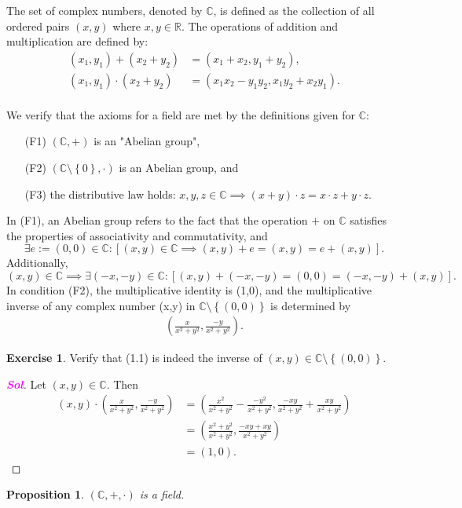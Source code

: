\documentclass[12pt,openany]{book}
\newtheorem{proposition}[theorem]{Proposition}
\theoremstyle{definition}
\newtheorem{exercise}{Exercise}[section]
\newcommand{\set}[1]{\left\{#1\right\}}
\newcommand{\R}{\mathbb{R}}
\newcommand{\C}{\mathbb{C}}
\newcommand{\of}[1]{\left( #1 \right)}
\newcommand{\sol}{\textcolor{magenta}{\bf Sol}}
\begin{document}
	The set of complex numbers, denoted by $\C$, is defined as the collection of all ordered pairs $(x,y)$ where $x,y\in\R$. The operations of addition and multiplication are defined by:\begin{align*}
		(x_1,y_1)+(x_2+y_2)&=(x_1+x_2,y_1+y_2),\\
		(x_1,y_1)\cdot(x_2+y_2)&=(x_1x_2-y_1y_2,x_1y_2+x_2y_1).\\
	\end{align*}
	
	We verify that the axioms for a field are met by the definitions given for $\C$: \begin{itemize}
		\item[(F1)] $\of{\C,+}$ is an "Abelian group",
		\item[(F2)] $\of{\C\setminus\set{0},\cdot}$ is an Abelian group, and
		\item[(F3)] the distributive law holds: $x,y,z\in\C\implies\of{x+y}\cdot z=x\cdot z+y\cdot z$.
	\end{itemize}
	
	In (F1), an Abelian group refers to the fact that the operation $+$ on $\C$ satisfies the properties of associativity and commutativity, and \[
	\exists e:=(0,0)\in\C:[(x,y)\in\C\implies(x,y)+e=(x,y)=e+(x,y)].
	\] Additionally, \[
	(x,y)\in\C\implies\exists(-x,-y)\in\C:[(x,y)+(-x,-y)=(0,0)=(-x,-y)+(x,y)].
	\] In condition (F2), the multiplicative identity is (1,0), and the multiplicative inverse of any complex number (x,y) in $\C\setminus\set{(0,0)}$ is determined by \begin{align}
		\of{\frac{x}{x^2+y^2},\frac{-y}{x^2+y^2}}.
	\end{align}
	
	\begin{exercise}
		Verify that (1.1) is indeed the inverse of $(x,y)\in\C\setminus\set{(0,0)}$.
		\begin{proof}[\sol]
			Let $(x,y)\in\C$. Then \begin{align*}
				(x,y)\cdot\of{\frac{x}{x^2+y^2},\frac{-y}{x^2+y^2}}
				&=\of{\frac{x^2}{x^2+y^2}-\frac{-y^2}{x^2+y^2},\frac{-xy}{x^2+y^2}+\frac{xy}{x^2+y^2}}\\
				&=\of{\frac{x^2+y^2}{x^2+y^2},\frac{-xy+xy}{x^2+y^2}}\\
				&=(1,0).
			\end{align*}
		\end{proof}
	\end{exercise}
	
	\begin{tcolorbox}[title=Complex Numbers are Field]
		\begin{proposition}
			$\of{\C,+,\cdot}$ is a field.
		\end{proposition}
	\end{tcolorbox}
	
\end{document}
